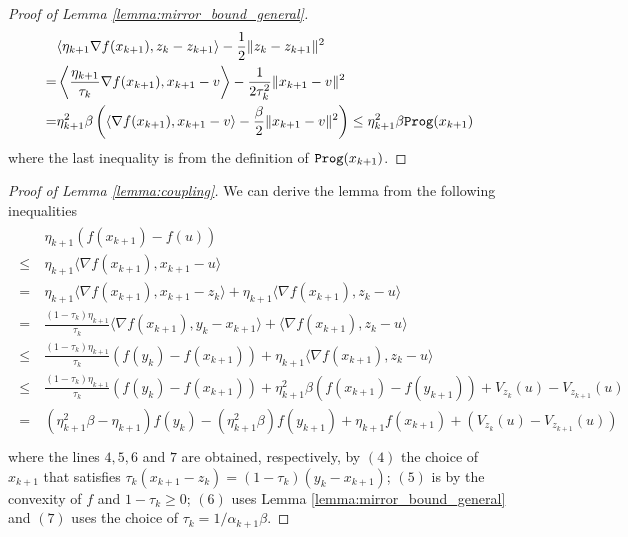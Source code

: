\begin{proof}[Proof of Lemma \ref{lemma:mirror_bound_general}]
\begin{align*}\label{actual_regret_linear_coupling}
    \begin{aligned}
        &\langle \eta_{k+1} \nabla f(x_{k+1}), z_k - z_{k+1} \rangle - \frac{1}{2}\|z_k - z_{k+1}\|^2  \\
        = & \left\langle \frac{\eta_{k+1}}{\tau_k} \nabla f(x_{k+1}), x_{k+1} - v \right\rangle - \frac{1}{2\tau_k^2} \|x_{k+1} - v \|^2 \\
        = & \eta_{k+1}^2 \beta \left( \langle \nabla f(x_{k+1}), x_{k+1} -v \rangle - \frac{\beta}{2} \|x_{k+1} - v\|^2\right) \leq \eta_{k+1}^2 \beta {\tt{Prog}}(x_{k+1})
    \end{aligned}
\end{align*}
where the last inequality is from the definition of ${\tt{Prog}}(x_{k+1})$.

\end{proof}


\begin{proof}[Proof of Lemma \ref{lemma:coupling}]
We can derive the lemma from the following inequalities
\begin{align*}\label{actual_regret_linear_coupling}
    \begin{aligned}
        &\ \eta_{k+1}(f(x_{k+1}) -f(u)) \\
        \leq &\ \eta_{k+1} \langle \nabla f(x_{k+1}), x_{k+1} -u \rangle \\
        = &\ \eta_{k+1} \langle \nabla f(x_{k+1}), x_{k+1} -z_{k} \rangle + \eta_{k+1} \langle \nabla f(x_{k+1}), z_k -u \rangle \\
        = &\ \frac{(1-\tau_k)\eta_{k+1}}{\tau_k} \langle \nabla f(x_{k+1}), y_k - x_{k+1} \rangle + \langle \nabla f(x_{k+1}), z_k - u \rangle \\
        \leq &\ \frac{(1-\tau_k)\eta_{k+1}}{\tau_k}(f(y_k)-f(x_{k+1})) + \eta_{k+1} \langle \nabla f(x_{k+1}), z_k-u \rangle \\
        \leq &\ \frac{(1-\tau_k)\eta_{k+1}}{\tau_k}(f(y_k)-f(x_{k+1})) + \eta_{k+1}^2 \beta (f(x_{k+1}) - f(y_{k+1}))  + V_{z_k}(u) - V_{z_{k+1}}(u)\\
        = &\ (\eta_{k+1}^2\beta -\eta_{k+1})f(y_k) -(\eta_{k+1}^2 \beta)f(y_{k+1})  +\eta_{k+1}f(x_{k+1})   + \left( V_{z_k}(u) - V_{z_{k+1}}(u)\right)\\
    \end{aligned}
\end{align*}
where the lines $4,5,6$ and $7$ are obtained, respectively, by $(4)$ the choice of $x_{k+1}$ that satisfies $\tau_k(x_{k+1} - z_k) = (1-\tau_k) (y_k - x_{k+1})$; $(5)$ is by the convexity of $f$ and $1-\tau_k \geq 0$; $(6)$ uses Lemma \ref{lemma:mirror_bound_general} and $(7)$ uses the choice of $\tau_k = 1/\alpha_{k+1}\beta$.
\end{proof}
